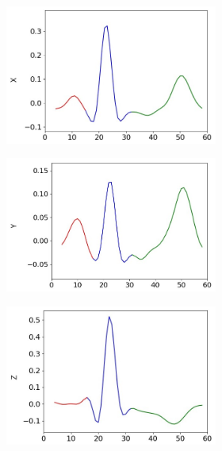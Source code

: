 \documentclass[12pt,italian]{report}
\begin{document}
	\begin{figure}[H]
		\begin{subfigure}{0.4\textwidth}
			\centering
			\begin{subfigure}{\textwidth}
				\centering
				\includegraphics[width=1\textwidth]{immagini/lead_x.png}
				\captionsetup{justification=centering}
				\caption{}
				\label{fig:lead_x}
			\end{subfigure}
			\begin{subfigure}{\textwidth}
				\centering
				\includegraphics[width=1\textwidth]{immagini/lead_y.png}
				\captionsetup{justification=centering}
				\caption{}
				\label{fig:lead_y}
			\end{subfigure}
			\begin{subfigure}{\textwidth}
				\centering
				\includegraphics[width=1\textwidth]{immagini/lead_z.png}

\end{subfigure}
\end{subfigure}
\end{figure}
\end{document}
